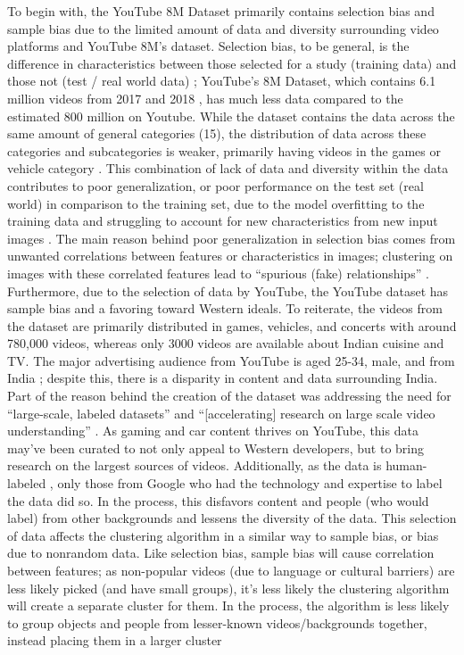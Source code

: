 \documentclass[10pt,twocolumn]{article}
\begin{document}

To begin with, the YouTube 8M Dataset primarily contains selection bias and sample bias due to the limited amount of data and diversity surrounding video platforms and YouTube 8M’s dataset. Selection bias, to be general, is the difference in characteristics between those selected for a study (training data) and those not (test / real world data) \cite{Yu2020}; YouTube’s 8M Dataset, which contains 6.1 million videos from 2017 and 2018 \cite{googleYT8M}, has much less data compared to the estimated 800 million on Youtube. While the dataset contains the data across the same amount of general categories (15), the distribution of data across these categories and subcategories is weaker, primarily having videos in the games or vehicle category \cite{googleYT8M}. This combination of lack of data and diversity within the data contributes to poor generalization, or poor performance on the test set (real world) in comparison to the training set, due to the model overfitting to the training data and struggling to account for new characteristics from new input images \cite{Yu2020}. The main reason behind poor generalization in selection bias comes from unwanted correlations between features or characteristics in images; clustering on images with these correlated features lead to “spurious (fake) relationships” \cite{Yu2020}. Furthermore, due to the selection of data by YouTube, the YouTube dataset has sample bias and a favoring toward Western ideals. To reiterate, the videos from the dataset are primarily distributed in games, vehicles, and concerts with around 780,000 videos, whereas only 3000 videos are available about Indian cuisine and TV. The major advertising audience from YouTube is aged 25-34, male, and from India \cite{HootSuite2022}; despite this, there is a disparity in content and data surrounding India. Part of the reason behind the creation of the dataset was addressing the need for “large-scale, labeled datasets” and “[accelerating] research on large scale video understanding” \cite{Warrick2020}. As gaming and car content thrives on YouTube, this data may’ve been curated to not only appeal to Western developers, but to bring research on the largest sources of videos. Additionally, as the data is human-labeled \cite{googleYT8M}, only those from Google who had the technology and expertise to label the data did so. In the process, this disfavors content and people (who would label) from other backgrounds and lessens the diversity of the data. This selection of data affects the clustering algorithm in a similar way to sample bias, or bias due to nonrandom data. Like selection bias, sample bias will cause correlation between features; as non-popular videos (due to language or cultural barriers) are less likely picked (and have small groups), it’s less likely the clustering algorithm will create a separate cluster for them. In the process, the algorithm is less likely to group objects and people from lesser-known videos/backgrounds together, instead placing them in a larger cluster 
\end{document}

